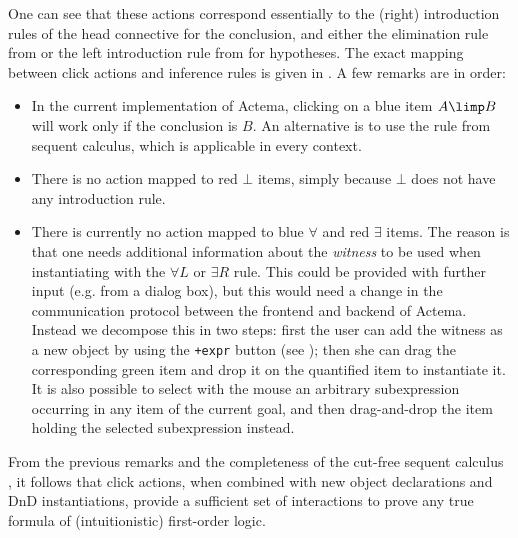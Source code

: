 One can see that these actions correspond essentially to the (right)
introduction rules of the head connective for the conclusion, and either the
elimination rule from  or the left introduction rule from  for
hypotheses. The exact mapping between click actions and inference rules is
given in . A few remarks are in order:
\begin{itemize}
  \item In the current implementation of Actema, clicking on a blue item $A
  \limp B$ will work only if the conclusion is $B$. An alternative is to use the
  {} rule from sequent calculus, which is applicable in every
  context.
  \item There is no action mapped to red $\bot$ items, simply because $\bot$
  does not have any introduction rule.
  \item There is currently no action mapped to blue $∀$ and red $∃$ items. The
  reason is that one needs additional information about the \emph{witness} to be
  used when instantiating with the $∀L$ or $∃R$ rule. This could be provided
  with further input (e.g. from a dialog box), but this would need a change in
  the communication protocol between the frontend and backend of Actema. Instead
  we decompose this in two steps: first the user can add the witness as a new
  object by using the \texttt{+expr} button (see ); then she
  can drag the corresponding green item and drop it on the quantified item to
  instantiate it. It is also possible to select with the mouse an arbitrary
  subexpression occurring in any item of the current goal, and then
  drag-and-drop the item holding the selected subexpression instead.
\end{itemize}

\begin{remark}\label{rem:click-completeness}
  From the previous remarks and the completeness of the cut-free sequent
  calculus , it follows that click actions, when combined with new
  object declarations and DnD instantiations, provide a sufficient set of
  interactions to prove any true formula of (intuitionistic) first-order logic.
\end{remark}


